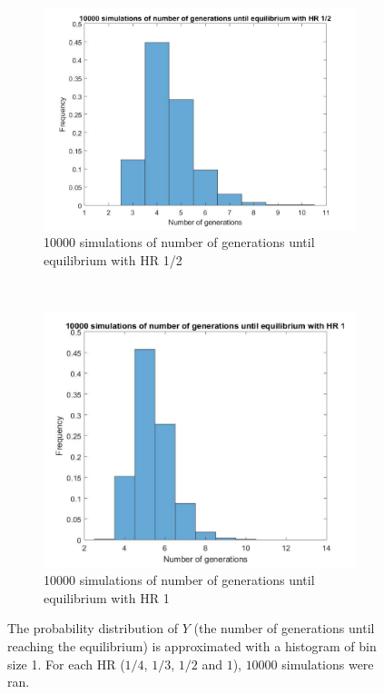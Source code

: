 \begin{figure}[H]
\begin{subfigure}{0.45\textwidth}
        \label{hist hap 1/3}
    \end{subfigure}
	~
    \begin{subfigure}{0.45\textwidth}
        \includegraphics[width=\textwidth]{GenormHistogramAantalgen2.pdf}
        \caption{10000 simulations of number of generations until equilibrium with HR 1/2}
        \label{hist hap 1/2}
    \end{subfigure}
    ~
    \begin{subfigure}{0.45\textwidth}
        \includegraphics[width=\textwidth]{GenormHistogramAantalgen1.pdf}
        \caption{10000 simulations of number of generations until equilibrium with HR 1}
        \label{hist hap 1}
    \end{subfigure}
    \caption{The probability distribution of $Y$ (the number of generations until reaching the equilibrium) is approximated with a histogram of bin size 1. 
    For each HR ($1/4$, $1/3$, $1/2$ and $1$), $10000$ simulations were ran.}
    \label{fig:histogram}
\end{figure}


